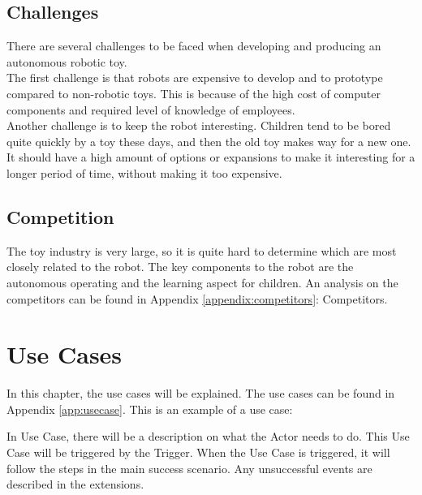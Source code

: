 \documentclass[11pt,twoside,a4paper]{report}
\begin{document}
\section{Challenges}
There are several challenges to be faced when developing and producing an autonomous robotic toy. \\
The first challenge is that robots are expensive to develop and to prototype compared to non-robotic toys. This is because of the high cost of computer components and required level of knowledge of employees.\\
Another challenge is to keep the robot interesting. Children tend to be bored quite quickly by a toy these days, and then the old toy makes way for a new one. It should have a high amount of options or expansions to make it interesting for a longer period of time, without making it too expensive. 
\section{Competition}
The toy industry is very large, so it is quite hard to determine which are most closely related to the robot. The key components to the robot are the autonomous operating and the learning aspect for children. An analysis on the competitors can be found in Appendix \ref{appendix:competitors}: Competitors.

\chapter{Use Cases}
In this chapter, the use cases will be explained. The use cases can be found in Appendix \ref{app:usecase}. 
This is an example of a use case:

\begin{usecase}
\end{usecase}
In Use Case, there will be a description on what the Actor needs to do. This Use Case will be triggered by the Trigger. When the Use Case is triggered, it will follow the steps in the main success scenario. Any unsuccessful events are described in the extensions. 
\end{document}
